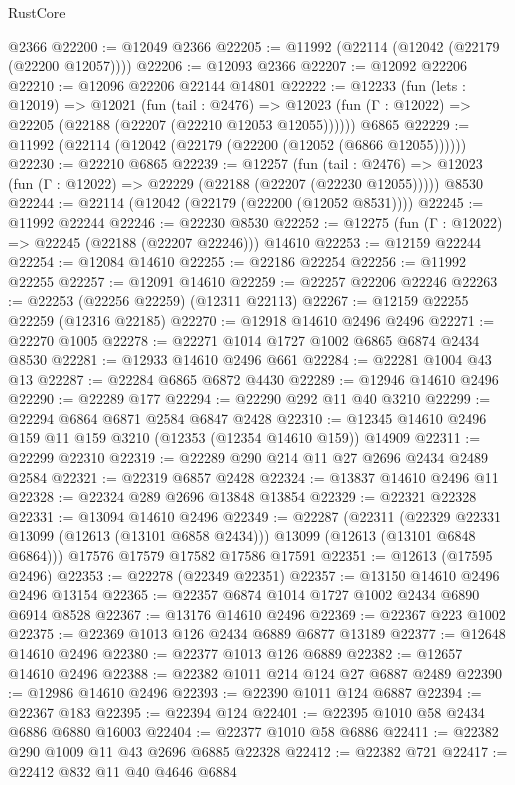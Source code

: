 \begin{lexlean}{RustCore}
\begin{coremodule}
    @2366
@22200 := @12049 @2366
@22205 := @11992 (@22114 (@12042 (@22179 (@22200 @12057))))
@22206 := @12093 @2366
@22207 := @12092 @22206
@22210 := @12096 @22206 @22144 @14801
@22222 := @12233
    (fun (lets : @12019) =>
    @12021
      (fun (tail : @2476) =>
      @12023 (fun (Γ : @12022) => @22205 (@22188 (@22207 (@22210 @12053 @12055))))))
    @6865
@22229 := @11992 (@22114 (@12042 (@22179 (@22200 (@12052 (@6866 @12055))))))
@22230 := @22210 @6865
@22239 := @12257
    (fun (tail : @2476) => @12023 (fun (Γ : @12022) => @22229 (@22188 (@22207 (@22230 @12055)))))
    @8530
@22244 := @22114 (@12042 (@22179 (@22200 (@12052 @8531))))
@22245 := @11992 @22244
@22246 := @22230 @8530
@22252 := @12275 (fun (Γ : @12022) => @22245 (@22188 (@22207 @22246))) @14610
@22253 := @12159 @22244
@22254 := @12084 @14610
@22255 := @22186 @22254
@22256 := @11992 @22255
@22257 := @12091 @14610
@22259 := @22257 @22206 @22246
@22263 := @22253 (@22256 @22259) (@12311 @22113)
@22267 := @12159 @22255 @22259 (@12316 @22185)
@22270 := @12918 @14610 @2496 @2496
@22271 := @22270 @1005
@22278 := @22271 @1014 @1727 @1002 @6865 @6874 @2434 @8530
@22281 := @12933 @14610 @2496 @661
@22284 := @22281 @1004 @43 @13
@22287 := @22284 @6865 @6872 @4430
@22289 := @12946 @14610 @2496
@22290 := @22289 @177
@22294 := @22290 @292 @11 @40 @3210
@22299 := @22294 @6864 @6871 @2584 @6847 @2428
@22310 := @12345 @14610 @2496 @159 @11 @159 @3210 (@12353 (@12354 @14610 @159)) @14909
@22311 := @22299 @22310
@22319 := @22289 @290 @214 @11 @27 @2696 @2434 @2489 @2584
@22321 := @22319 @6857 @2428
@22324 := @13837 @14610 @2496 @11
@22328 := @22324 @289 @2696 @13848 @13854
@22329 := @22321 @22328
@22331 := @13094 @14610 @2496
@22349 := @22287
    (@22311
      (@22329 @22331 @13099 (@12613 (@13101 @6858 @2434)))
      @13099
      (@12613 (@13101 @6848 @6864)))
    @17576
    @17579
    @17582
    @17586
    @17591
@22351 := @12613 (@17595 @2496)
@22353 := @22278 (@22349 @22351)
@22357 := @13150 @14610 @2496 @2496 @13154
@22365 := @22357 @6874 @1014 @1727 @1002 @2434 @6890 @6914 @8528
@22367 := @13176 @14610 @2496
@22369 := @22367 @223 @1002
@22375 := @22369 @1013 @126 @2434 @6889 @6877 @13189
@22377 := @12648 @14610 @2496
@22380 := @22377 @1013 @126 @6889
@22382 := @12657 @14610 @2496
@22388 := @22382 @1011 @214 @124 @27 @6887 @2489
@22390 := @12986 @14610 @2496
@22393 := @22390 @1011 @124 @6887
@22394 := @22367 @183
@22395 := @22394 @124
@22401 := @22395 @1010 @58 @2434 @6886 @6880 @16003
@22404 := @22377 @1010 @58 @6886
@22411 := @22382 @290 @1009 @11 @43 @2696 @6885 @22328
@22412 := @22382 @721
@22417 := @22412 @832 @11 @40 @4646 @6884

\end{coremodule}
\end{lexlean}
